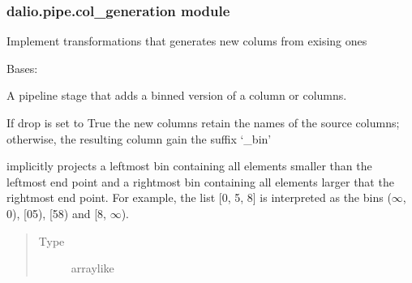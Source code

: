 \documentclass[letterpaper,10pt,english]{sphinxmanual}
\begin{document}
\subsubsection{dalio.pipe.col\_generation module}
\label{\detokenize{dalio.pipe:module-dalio.pipe.col_generation}}\label{\detokenize{dalio.pipe:dalio-pipe-col-generation-module}}
Implement transformations that generates new colums from exising ones

\begin{fulllineitems}
\label{\detokenize{dalio.pipe:dalio.pipe.col_generation.Bin}}
Bases: {\hyperref[\detokenize{dalio.pipe:dalio.pipe.col_generation.Custom}]{}}

A pipeline stage that adds a binned version of a column or columns.

If drop is set to True the new columns retain the names of the source
columns; otherwise, the resulting column gain the suffix ‘\_bin’

\begin{fulllineitems}
\label{\detokenize{dalio.pipe:dalio.pipe.col_generation.Bin.bin_map}}
implicitly projects a left\sphinxhyphen{}most bin containing
all elements smaller than the left\sphinxhyphen{}most end point and a right\sphinxhyphen{}most
bin containing all elements larger that the right\sphinxhyphen{}most end point.
For example, the list {[}0, 5, 8{]} is interpreted as
the bins (\sphinxhyphen{}\(\infty\), 0), {[}0\sphinxhyphen{}5), {[}5\sphinxhyphen{}8) and {[}8, \(\infty\)).
\begin{quote}\begin{description}
\item[{Type}] \leavevmode
array\sphinxhyphen{}like


\end{description}
\end{quote}
\end{fulllineitems}
\end{fulllineitems}
\end{document}
